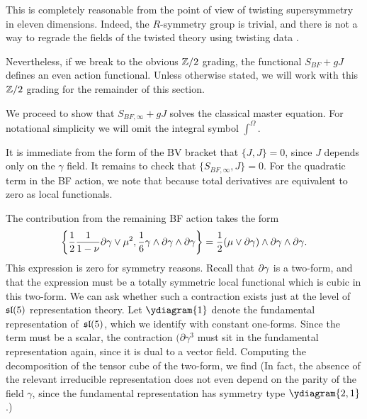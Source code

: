 This is completely reasonable from the point of view of twisting supersymmetry in eleven dimensions. 
Indeed, the $R$-symmetry group is trivial, and there is not a way to regrade the fields of the twisted theory using twisting data \label{CosHol,ESW}. 

Nevertheless, if we break to the obvious $\mathbb Z/2$ grading, the functional $S_{BF} + g J$ defines an even action functional.
Unless otherwise stated, we will work with this $\mathbb Z/2$ grading for the remainder of this section.

\parsec[]
We proceed to show that $S_{BF,\infty} + g J$ solves the classical master equation.
For notational simplicity we will omit the integral symbol $\int^\Omega$.


It is immediate from the form of the BV bracket that $\{J,J\} = 0$, since $J$ depends only on the $\gamma$ field. 
It remains to check that $\{S_{BF,\infty},J\} = 0$. 
For the quadratic term in the BF action, we note that 
  because total derivatives are equivalent to zero as local functionals. 
  
The contribution from the remaining BF action takes the form
\[
    \left\{ \frac12 \frac{1}{1-\nu} \partial\gamma \vee \mu^2, \frac16 \gamma \wedge \partial\gamma \wedge \partial \gamma \right\} =\frac12 (\mu \vee \partial \gamma) \wedge \partial \gamma \wedge \partial \gamma .
\]
This expression is zero for symmetry reasons. 
Recall that $\partial\gamma$ is a two-form, and that the expression must be a totally symmetric local functional which is cubic in this two-form. We can ask whether such a  contraction exists just at the level of $\mathfrak{sl}(5)$ representation theory. Let $\ydiagram{1}$ denote the fundamental representation of~$\mathfrak{sl}(5)$, which we identify with constant one-forms. Since the term must be a scalar, the contraction $(\partial\gamma^3$ must sit in the fundamental representation again, since it is dual to a vector field. Computing the decomposition of the tensor cube of the two-form, we find
(In fact, the absence  of the relevant irreducible representation does not  even depend on the parity of the  field $\gamma$, since 
the  fundamental representation has symmetry type $\ydiagram{2,1}$.) 


